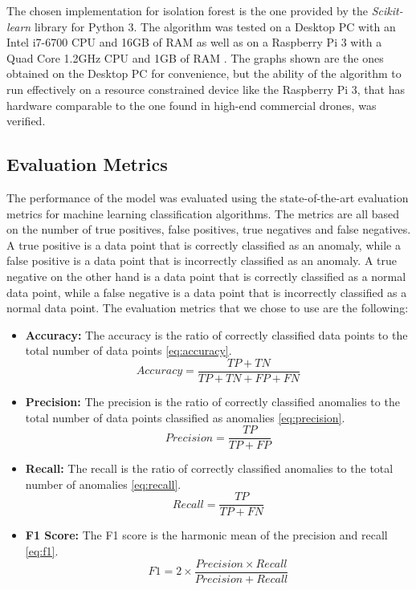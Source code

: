 \documentclass[futureinternet,article,submit,pdftex,moreauthors]{Definitions/mdpi}
\begin{document}
The chosen implementation for isolation forest is the one provided by the \textit{Scikit-learn} library \cite{IsolationForestScikitLearn} for Python 3. 
The algorithm was tested on a Desktop PC with an Intel i7-6700 CPU and 16GB of RAM as well as on a Raspberry Pi 3 with a Quad Core 1.2GHz CPU and 1GB of RAM \cite{RaspberryPi3ModelB}.
The graphs shown are the ones obtained on the Desktop PC for convenience,  but the ability of the algorithm to run effectively on a resource constrained device like the Raspberry Pi 3, that has hardware comparable to the one found in high-end commercial drones, was verified. 

\subsection{Evaluation Metrics}

The performance of the model was evaluated using the state-of-the-art evaluation metrics for machine learning classification algorithms. The metrics are all based on the number of true positives, false positives, true negatives and false negatives. A true positive is a data point that is correctly classified as an anomaly, while a false positive is a data point that is incorrectly classified as an anomaly. A true negative on the other hand is a data point that is correctly classified as a normal data point, while a false negative is a data point that is incorrectly classified as a normal data point.
The evaluation metrics that we chose to use are the following: 

\begin{itemize}
	\item \textbf{Accuracy:} The accuracy is the ratio of correctly classified data points to the total number of data points \ref{eq:accuracy}.
	\begin{equation}
		\label{eq:accuracy}
	  Accuracy = \frac{TP + TN}{TP + TN + FP + FN}
	\end{equation}
	\item \textbf{Precision:} The precision is the ratio of correctly classified anomalies to the total number of data points classified as anomalies \ref{eq:precision}.
	\begin{equation}
		\label{eq:precision}
	  Precision = \frac{TP}{TP + FP}
	\end{equation}
	\item \textbf{Recall:} The recall is the ratio of correctly classified anomalies to the total number of anomalies \ref{eq:recall}.
	\begin{equation}
		\label{eq:recall}
	  Recall = \frac{TP}{TP + FN}
	\end{equation}
	\item \textbf{F1 Score:} The F1 score is the harmonic mean of the precision and recall \ref{eq:f1}.
	\begin{equation}
		\label{eq:f1}
	  F1 = 2 \times \frac{Precision \times Recall}{Precision + Recall}
	\end{equation}
\end{itemize}
\end{document}
